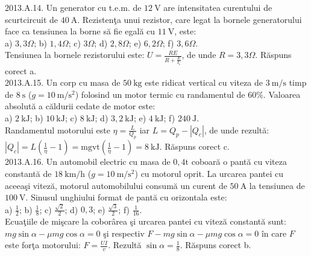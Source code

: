 2013.A.14. Un generator cu t.e.m. de $12 \mathrm{~V}$ are intensitatea curentului de scurtcircuit de $40 \mathrm{~A}$. Rezistenţa unui rezistor, care legat la bornele generatorului face ca tensiunea la borne să fie egală cu $11 \mathrm{~V}$, este:\\ a) $3,3 \Omega$; b) $1,4 \Omega$; c) $3 \Omega$; d) $2,8 \Omega$; e) $6,2 \Omega$; f) $3,6 \Omega$.\\ Tensiunea la bornele rezistorului este: $U=\frac{R E}{R+\frac{E}{I_{s}}}$, de unde $R=3,3 \Omega$. Răspuns corect a.\\

2013.A.15. Un corp cu masa de $50 \mathrm{~kg}$ este ridicat vertical cu viteza de $3 \mathrm{~m} / \mathrm{s}$ timp de $8 \mathrm{~s}$ ($g=10 \mathrm{~m} / \mathrm{s}^{2}$) folosind un motor termic cu randamentul de $60 \%$. Valoarea absolută a căldurii cedate de motor este:\\ a) $2 \mathrm{~kJ}$; b) $10 \mathrm{~kJ}$; c) $8 \mathrm{~kJ}$; d) $3,2 \mathrm{~kJ}$; e) $4 \mathrm{~kJ}$; f) $240 \mathrm{~J}$.\\ Randamentul motorului este $\eta=\frac{L}{Q_{p}}$ iar $L=Q_{p}-\left|Q_{c}\right|$, de unde rezultă:\\ $\left|Q_{c}\right|=L\left(\frac{1}{\eta}-1\right)=\mathrm{m g v t}\left(\frac{1}{\eta}-1\right)=8 \mathrm{~kJ}$. Răspuns corect c.\\

2013.A.16. Un automobil electric cu masa de $0,4 \mathrm{t}$ coboară o pantă cu viteza constantă de $18 \mathrm{~km} / \mathrm{h}$ ($g=10 \mathrm{~m} / \mathrm{s}^{2}$) cu motorul oprit. La urcarea pantei cu aceeaşi viteză, motorul automobilului consumă un curent de $50 \mathrm{~A}$ la tensiunea de $100 \mathrm{~V}$. Sinusul unghiului format de pantă cu orizontala este:\\ a) $\frac{1}{2}$; b) $\frac{1}{8}$; c) $\frac{\sqrt{2}}{2}$; d) $0,3$; e) $\frac{\sqrt{3}}{2}$; f) $\frac{1}{16}$.\\ Ecuaţiile de mişcare la coborârea şi urcarea pantei cu viteză constantă sunt: $m g \sin \alpha-\mu m g \cos \alpha=0$ şi respectiv $F-m g \sin \alpha-\mu m g \cos \alpha=0$ în care $F$ este forţa motorului: $F=\frac{U I}{v}$. Rezultă $\sin \alpha=\frac{1}{8}$. Răspuns corect b.\\

